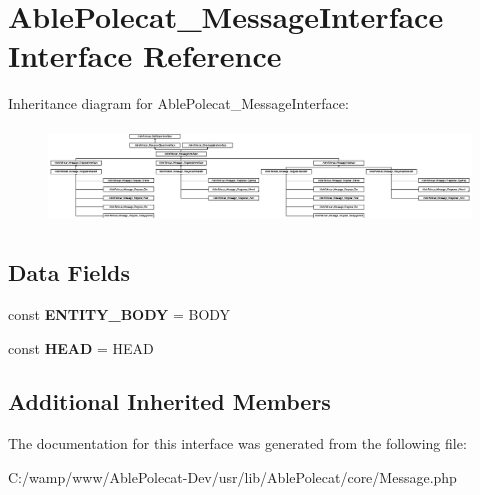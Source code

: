 \hypertarget{interface_able_polecat___message_interface}{}\section{Able\+Polecat\+\_\+\+Message\+Interface Interface Reference}
\label{interface_able_polecat___message_interface}
Inheritance diagram for Able\+Polecat\+\_\+\+Message\+Interface\+:\begin{figure}[H]
\begin{center}
\leavevmode
\includegraphics[height=2.545455cm]{interface_able_polecat___message_interface}
\end{center}
\end{figure}
\subsection*{Data Fields}
\begin{DoxyCompactItemize}
\item 
\hypertarget{interface_able_polecat___message_interface_a1b32af236e7e6a142206653f9f10f22c}{}const {\bfseries E\+N\+T\+I\+T\+Y\+\_\+\+B\+O\+D\+Y} = \textquotesingle{}B\+O\+D\+Y\textquotesingle{}\label{interface_able_polecat___message_interface_a1b32af236e7e6a142206653f9f10f22c}

\item 
\hypertarget{interface_able_polecat___message_interface_a43d3cf541a304c995ca17a9fd44d69e9}{}const {\bfseries H\+E\+A\+D} = \textquotesingle{}H\+E\+A\+D\textquotesingle{}\label{interface_able_polecat___message_interface_a43d3cf541a304c995ca17a9fd44d69e9}

\end{DoxyCompactItemize}
\subsection*{Additional Inherited Members}


The documentation for this interface was generated from the following file\+:\begin{DoxyCompactItemize}
\item 
C\+:/wamp/www/\+Able\+Polecat-\/\+Dev/usr/lib/\+Able\+Polecat/core/Message.\+php\end{DoxyCompactItemize}
